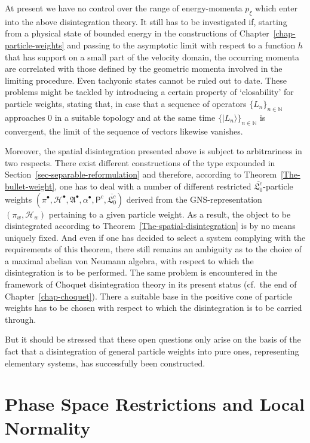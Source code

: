 \documentclass[11pt,twoside,openright]{report}
\theoremstyle{definition}
\theoremstyle{plain}
\theoremstyle{remark}
\theoremstyle{assumption}
\newcommand{\set}[1]{\{ #1 \}}
\newcommand{\bset}[1]{\bigl\{ #1 \bigr\}}
\newcommand{\ket}[1]{\vert #1 \rangle}
\newcommand{\Nbb}{\mathbb{N}}
\newcommand{\Hscr}{\mathscr{H}}
\newcommand{\Pcount}{\mathsf{P}^c}
\newcommand{\vaccountbar}{\overline{\mathfrak{L}_0^c}}
\newcommand{\Hbullet}{\mathscr{H}^\bullet}
\newcommand{\Abullet}{\mathfrak{A}^\bullet}
\begin{document}
At present we have no control over the range of energy-momenta $p_\xi$
which enter into the above disintegration theory. It still has to be
investigated if, starting from a physical state of bounded energy in
the constructions of Chapter~\ref{chap-particle-weights} and passing
to the asymptotic limit with respect to a function $h$ that has
support on a small part of the velocity domain, the occurring momenta
are correlated with those defined by the geometric momenta involved in
the limiting procedure. Even tachyonic states cannot be ruled out to
date. These problems might be tackled by introducing a certain
property of `closability' for particle weights, stating that, in case
that a sequence of operators $\set{L_n}_{n \in \Nbb}$ approaches $0$
in a suitable topology and at the same time $\bset{\ket{L_n}}_{n \in
\Nbb}$ is convergent, the limit of the sequence of vectors likewise
vanishes.

Moreover, the spatial disintegration presented above is subject to 
arbitrariness in two respects. There exist different constructions of
the type expounded in Section~\ref{sec-separable-reformulation} and
therefore, according to Theorem~\ref{The-bullet-weight}, one has to
deal with a number of different restricted $\vaccountbar$-particle
weights $( \pi^\bullet , \Hbullet , \Abullet , \alpha^\bullet ,
\Pcount , \vaccountbar)$ derived from the GNS-representa\-tion $(
\pi_w , \Hscr_w )$ pertaining to a given particle weight. As a result,
the object to be disintegrated according to
Theorem~\ref{The-spatial-disintegration} is by no means uniquely
fixed. And even if one has decided to select a system complying with
the requirements of this theorem, there still remains an ambiguity as
to the choice of a maximal abelian von Neumann algebra, with respect
to which the disintegration is to be performed. The same problem is
encountered in the framework of Choquet disintegration theory in its
present status (cf.~the end of Chapter~\ref{chap-choquet}). There a
suitable base in the positive cone of particle weights has to be
chosen with respect to which the disintegration is to be carried
through.

But it should be stressed that these open questions only arise on the
basis of the fact that a disintegration of general particle weights
into pure ones, representing elementary systems, has successfully been
constructed.



\chapter{Phase Space Restrictions and Local Normality}
  \label{chap-local-normality}
\end{document}
